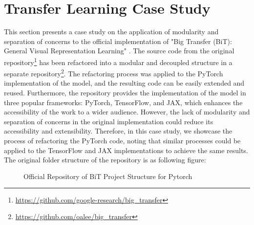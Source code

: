 \section{Transfer Learning Case Study}\label{transfer-study}



This section presents a case study on the application of modularity and separation of concerns to the official implementation of "Big Transfer (BiT): General Visual Representation Learning" \cite{transferlearning}. The source code from the original repository\footnote{\url{https://github.com/google-research/big_transfer}} has been refactored into a modular and decoupled structure in a separate repository\footnote{\url{https://github.com/oalee/big_transfer}}. The refactoring process was applied to the PyTorch implementation of the model, and the resulting code can be easily extended and reused. Furthermore, the repository provides the implementation of the model in three popular frameworks: PyTorch, TensorFlow, and JAX, which enhances the accessibility of the work to a wider audience. However, the lack of modularity and separation of concerns in the original implementation could reduce its accessibility and extensibility. Therefore, in this case study, we showcase the process of refactoring the PyTorch code, noting that similar processes could be applied to the TensorFlow and JAX implementations to achieve the same results. The original folder structure of the repository is as following figure:

\begin{figure}[H]
\centering
{}
\caption{
Official Repository of BiT Project Structure for Pytorch
}
\end{figure}



